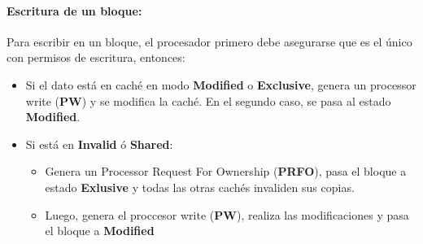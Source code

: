 \paragraph{Escritura de un bloque:} Para escribir en un bloque, el procesador primero debe asegurarse que es el único con permisos de escritura, entonces:

\begin{itemize}
	\item Si el dato está en caché en modo \textbf{Modified} o \textbf{Exclusive}, genera un processor write (\textbf{PW}) y se modifica la caché. En el segundo caso, se pasa al estado \textbf{Modified}.
	\item Si está en \textbf{Invalid} ó \textbf{Shared}:
	\begin{itemize}
		\item Genera un Processor Request For Ownership (\textbf{PRFO}), pasa el bloque a estado \textbf{Exlusive} y todas las otras cachés invaliden sus copias.
		\item Luego, genera el proccesor write (\textbf{PW}), realiza las modificaciones y pasa el bloque a \textbf{Modified}
	\end{itemize}
\end{itemize}
